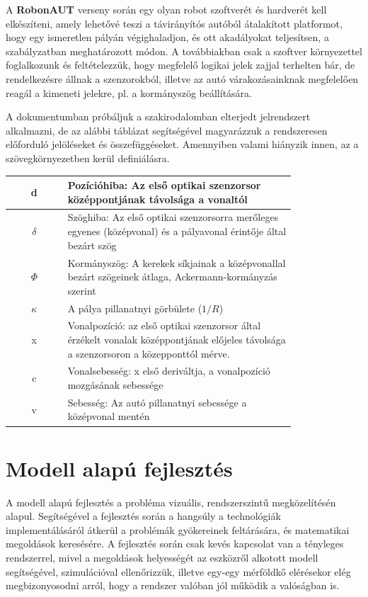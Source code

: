 A \textbf{RobonAUT} verseny során egy olyan robot szoftverét és hardverét kell elkészíteni, amely lehetővé teszi a távirányítós autóból átalakított platformot, hogy egy ismeretlen pályán végighaladjon, és ott akadályokat teljesítsen, a szabályzatban meghatározott módon. A továbbiakban csak a szoftver környezettel foglalkozunk és feltételezzük, hogy megfelelő logikai jelek zajjal terhelten bár, de rendelkezésre állnak a szenzorokból, illetve az autó várakozásainknak megfelelően reagál a kimeneti jelekre, pl. a kormányszög beállítására.

A dokumentumban próbáljuk a szakirodalomban elterjedt jelrendszert alkalmazni, de az alábbi táblázat segítségével magyarázzuk a rendszeresen előforduló jelöléseket és összefüggéseket. Amennyiben valami hiányzik innen, az a szövegkörnyezetben kerül definiálásra.

\begin{center}
  \begin{tabular}{| c | p{0.8\linewidth} |}
\hline
    d & Pozícióhiba: Az első optikai szenzorsor középpontjának távolsága a vonaltól \\ \hline
    $ \delta $ & Szöghiba: Az első optikai szenzorsorra merőleges egyenes (középvonal) és a pályavonal érintője által bezárt szög \\ \hline
    $ \Phi $ & Kormányszög: A kerekek síkjainak a középvonallal bezárt szögeinek átlaga, Ackermann-kormányzás szerint \\
    \hline
    $ \kappa $ & A pálya pillanatnyi görbülete ($1/R$) \\ \hline
    x & Vonalpozíció: az első optikai szenzorsor által érzékelt vonalak középpontjának előjeles távolsága a szenzorsoron a közepponttól mérve. \\ \hline
    c & Vonalsebesség: x első deriváltja, a vonalpozíció mozgásának sebessége \\ \hline
    v & Sebesség: Az autó pillanatnyi sebessége a középvonal mentén \\
    \hline
  \end{tabular}
\end{center}


\section{Modell alapú fejlesztés}

A modell alapú fejlesztés a probléma vizuális, rendszerszintű megközelítésén alapul. Segítségével a fejlesztés során a hangsúly a technológiák implementálásáról átkerül a problémák gyökereinek feltárására, és matematikai megoldások keresésére. A fejlesztés során csak kevés kapcsolat van a tényleges rendszerrel, mivel a megoldások helyességét az eszközről alkotott modell segítségével, szimulációval ellenőrizzük, illetve egy-egy mérföldkő elérésekor elég megbizonyosodni arról, hogy a rendszer valóban jól működik a valóságban is.

